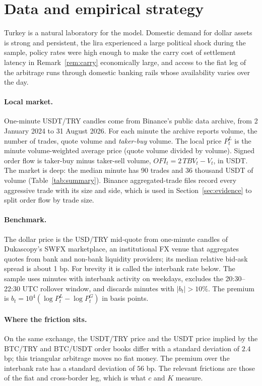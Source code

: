 \documentclass[12pt]{article}
\theoremstyle{definition}
\theoremstyle{remark}
\begin{document}
\section{Data and empirical strategy}\label{sec:empirics}

Turkey is a natural laboratory for the model. Domestic demand for dollar assets is strong and persistent, the lira experienced a large political shock during the sample, policy rates were high enough to make the carry cost of settlement latency in Remark~\ref{rem:carry} economically large, and access to the fiat leg of the arbitrage runs through domestic banking rails whose availability varies over the day.

\paragraph{Local market.} One-minute USDT/TRY candles come from Binance's public data archive, from 2 January 2024 to 31 August 2026. For each minute the archive reports volume, the number of trades, quote volume and \emph{taker-buy} volume. The local price $P^L_t$ is the minute volume-weighted average price (quote volume divided by volume). Signed order flow is taker-buy minus taker-sell volume, $\mathit{OFI}_t=2\,\mathit{TBV}_t-V_t$, in USDT. The market is deep: the median minute has 90 trades and 36 thousand USDT of volume (Table~\ref{tab:summary}). Binance aggregated-trade files record every aggressive trade with its size and side, which is used in Section~\ref{sec:evidence} to split order flow by trade size.

\paragraph{Benchmark.} The dollar price is the USD/TRY mid-quote from one-minute candles of Dukascopy's SWFX marketplace, an institutional FX venue that aggregates quotes from bank and non-bank liquidity providers; its median relative bid-ask spread is about 1 bp. For brevity it is called the interbank rate below. The sample uses minutes with interbank activity on weekdays, excludes the 20:30--22:30 UTC rollover window, and discards minutes with $|b_t|>10\%$. The premium is $b_t=10^4(\log P^L_t-\log P^G_t)$ in basis points.

\paragraph{Where the friction sits.} On the same exchange, the USDT/TRY price and the USDT price implied by the BTC/TRY and BTC/USDT order books differ with a standard deviation of $2.4$ bp; this triangular arbitrage moves no fiat money. The premium over the interbank rate has a standard deviation of $56$ bp. The relevant frictions are those of the fiat and cross-border leg, which is what $c$ and $K$ measure.
\end{document}
